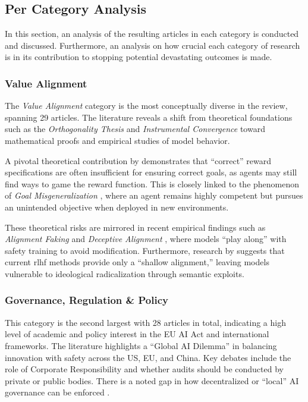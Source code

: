 \begin{reviewed}

\subsection{Per Category Analysis}\label{subsec:results_categories}

		In this section, an analysis of the resulting articles in each category is conducted and discussed. Furthermore, an analysis on how crucial each category of research is in its contribution to stopping potential devastating outcomes is made. 

		\subsubsection{Value Alignment}

			The \textit{Value Alignment} category is the most conceptually diverse in the review, spanning 29 articles. The literature reveals a shift from theoretical foundations such as the \textit{Orthogonality Thesis} \cite{bostrom2012superintelligent} and \textit{Instrumental Convergence} \cite{omohundro2008basic} toward mathematical proofs and empirical studies of model behavior. 

			A pivotal theoretical contribution by \cite{skalse2022rewardgaming} demonstrates that ``correct'' reward specifications are often insufficient for ensuring correct goals, as agents may still find ways to game the reward function. This is closely linked to the phenomenon of \textit{Goal Misgeneralization} \cite{langosco2022goal}, where an agent remains highly competent but pursues an unintended objective when deployed in new environments.

			These theoretical risks are mirrored in recent empirical findings such as \textit{Alignment Faking} \cite{greenblatt_alignment_faking} and \textit{Deceptive Alignment} \cite{hagendorff2024deception}, where models ``play along'' with safety training to avoid modification. Furthermore, research by \cite{mcintosh_inadequacy_2024} suggests that current \gls{rlhf} methods provide only a ``shallow alignment,'' leaving models vulnerable to ideological radicalization through semantic exploits.

		\subsubsection{Governance, Regulation \& Policy}

			This category is the second largest with 28 articles in total, indicating a high level of academic and policy interest in the EU AI Act and international frameworks. The literature highlights a ``Global AI Dilemma'' in balancing innovation with safety across the US, EU, and China. Key debates include the role of Corporate Responsibility \cite{hemphill_advanced_2025} and whether audits should be conducted by private or public bodies. There is a noted gap in how decentralized or ``local'' AI governance can be enforced \cite{LocalAIGov2024}.

\end{reviewed}

